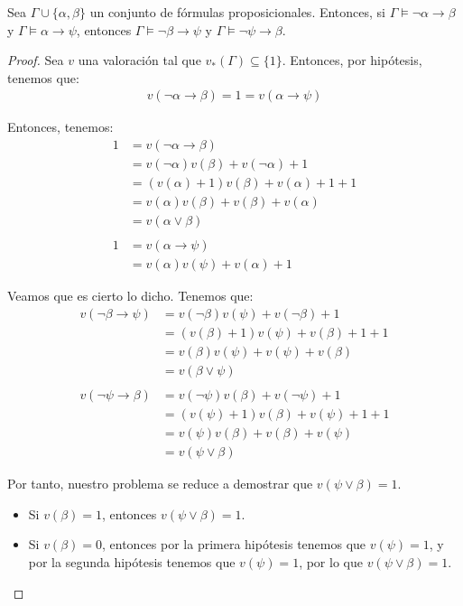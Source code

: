 \begin{ejercicio}
    Sea $\Gamma \cup \{\alpha,\beta\}$ un conjunto de fórmulas proposicionales.
    Entonces, si $\Gamma \vDash \lnot \alpha \rightarrow \beta$ y $\Gamma \vDash \alpha\rightarrow \psi$,
    entonces $\Gamma \vDash \lnot \beta \rightarrow \psi$ y $\Gamma \vDash \lnot \psi \rightarrow \beta$.
    \begin{proof}
        Sea $v$ una valoración tal que $v_\ast(\Gamma)\subseteq \{1\}$.
        Entonces, por hipótesis, tenemos que:
        \begin{align*}
            v(\lnot \alpha\rightarrow \beta)  = 1 = v(\alpha\rightarrow \psi)
        \end{align*}

        Entonces, tenemos:
        \begin{align*}
            1 &= v(\lnot \alpha \rightarrow \beta)\\
            &=v(\lnot \alpha)v(\beta)+v(\lnot \alpha)+1\\
            &= (v(\alpha)+1)v(\beta)+v(\alpha)+1+1\\
            &= v(\alpha)v(\beta)+v(\beta)+v(\alpha)\\
            &= v(\alpha\lor \beta)\\\\
            1 &= v(\alpha\rightarrow \psi)\\
            &= v(\alpha)v(\psi)+v(\alpha)+1
        \end{align*}

        Veamos que es cierto lo dicho. Tenemos que:
        \begin{align*}
            v(\lnot \beta\rightarrow \psi)
            &= v(\lnot \beta)v(\psi)+v(\lnot \beta)+1\\
            &= (v(\beta)+1)v(\psi)+v(\beta)+1+1\\
            &= v(\beta)v(\psi)+v(\psi)+v(\beta)\\
            &= v(\beta\lor \psi)\\ \\
            v(\lnot \psi\rightarrow \beta)
            &= v(\lnot \psi)v(\beta)+v(\lnot \psi)+1\\
            &= (v(\psi)+1)v(\beta)+v(\psi)+1+1\\
            &= v(\psi)v(\beta)+v(\beta)+v(\psi)\\
            &= v(\psi\lor \beta)
        \end{align*}

        Por tanto, nuestro problema se reduce a demostrar que $v(\psi\lor \beta)=1$.
        \begin{itemize}
            \item Si $v(\beta)=1$, entonces $v(\psi\lor \beta)=1$.
            \item Si $v(\beta)=0$, entonces por la primera hipótesis tenemos que $v(\psi)=1$, y por la
            segunda hipótesis tenemos que $v(\psi)=1$, por lo que $v(\psi\lor \beta)=1$. 
        \end{itemize}


\end{proof}
\end{ejercicio}
